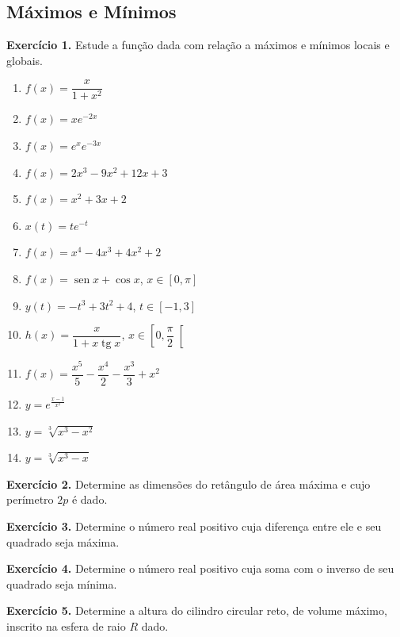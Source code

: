 \documentclass[12pt,a4paper]{article}
\begin{document}
\subsection{Máximos e Mínimos}
\vspace{0.5cm}
\noindent\textbf{Exercício 1.} Estude a função dada com relação a máximos e mínimos locais e globais.
\begin{enumerate}
    \renewcommand{\theenumi}{\alph{enumi}}
    \renewcommand{\labelenumi}{\theenumi)}
    \item $f(x) = \dfrac{x}{1 + x^2}$
    \item $f(x) = xe^{-2x}$
    \item $f(x) = e^x e^{-3x}$
    \item $f(x) = 2x^3 - 9x^2 + 12x + 3$
    \item $f(x) = x^2 + 3x + 2$
    \item $x(t) = te^{-t}$
    \item $f(x) = x^4 - 4x^3 + 4x^2 + 2$
    \item $f(x) = \operatorname{sen} x + \cos x$, $x \in [0, \pi]$
    \item $y(t) = -t^3 + 3t^2 + 4$, $t \in [-1, 3]$
    \item $h(x) = \dfrac{x}{1 + x\operatorname{tg} x}$, $x \in \left[0, \dfrac{\pi}{2}\right[$
    \item $f(x) = \dfrac{x^5}{5} - \dfrac{x^4}{2} - \dfrac{x^3}{3} + x^2$
    \item $y = e^{\frac{x-1}{x^2}}$
    \item $y = \sqrt[3]{x^3 - x^2}$
    \item $y = \sqrt[3]{x^3 - x}$
\end{enumerate}

\vspace{0.5cm}
\noindent\textbf{Exercício 2.} Determine as dimensões do retângulo de área máxima e cujo perímetro $2p$ é dado.

\vspace{0.5cm}
\noindent\textbf{Exercício 3.} Determine o número real positivo cuja diferença entre ele e seu quadrado seja máxima.

\vspace{0.5cm}
\noindent\textbf{Exercício 4.} Determine o número real positivo cuja soma com o inverso de seu quadrado seja mínima.

\vspace{0.5cm}
\noindent\textbf{Exercício 5.} Determine a altura do cilindro circular reto, de volume máximo, inscrito na esfera de raio $R$ dado.
\end{document}
